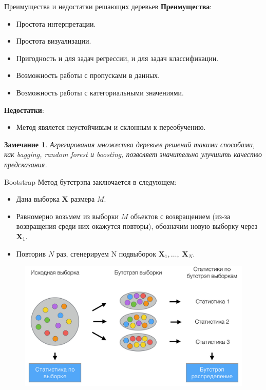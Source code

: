 \documentclass[notheorems, handout]{beamer}
\newtheorem{remark}{Замечание}
\begin{document}
\begin{frame}{Преимущества и недостатки решающих деревьев}
	\textbf{Преимущества}:
	\begin{itemize}
		\item Простота интерпретации.
		\item Простота визуализации.
		\item Пригодность и для задач регрессии, и для задач классификации.
		\item Возможность работы с пропусками в данных.
		\item Возможность работы с категориальными значениями.
	\end{itemize}
	\par\smallskip
	\textbf{Недостатки}:
	\begin{itemize}
		\item Метод явялется неустойчивым и склонным к переобучению.
	\end{itemize}
	\par\smallskip
	\begin{remark}
		Агрегирования множества деревьев решений такими способами, как bagging, random forest и boosting, позволяет значительно улучшить качество предсказания.
	\end{remark}
\end{frame}

\begin{frame}{Bootstrap}
	Метод бутстрэпа заключается в следующем:
	\begin{itemize}
		\item Дана выборка $\mathbf{X}$ размера $M$.
		\item Равномерно возьмем из выборки $M$ объектов с возвращением (из-за возвращения среди них окажутся повторы), обозначим новую выборку через $\mathbf{X}_{1}$.
		\item Повторив $N$ раз, сгенерируем N подвыборок $\mathbf{X}_{1}{,} \dots{,}\; \mathbf{X}_{N}$.
	\end{itemize}
	\par\smallskip
	\begin{figure}[h!]
		\includegraphics[width=0.7 \textwidth]{img/bootstrap}
	\end{figure}
\end{frame}
\end{document}
